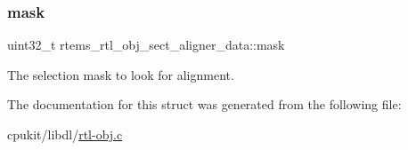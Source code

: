 \subsubsection{\texorpdfstring{mask}{mask}}
{\footnotesize\ttfamily uint32\+\_\+t rtems\+\_\+rtl\+\_\+obj\+\_\+sect\+\_\+aligner\+\_\+data\+::mask}

The selection mask to look for alignment. 

The documentation for this struct was generated from the following file\+:\begin{DoxyCompactItemize}
\item 
cpukit/libdl/\mbox{\hyperlink{rtl-obj_8c}{rtl-\/obj.\+c}}\end{DoxyCompactItemize}
